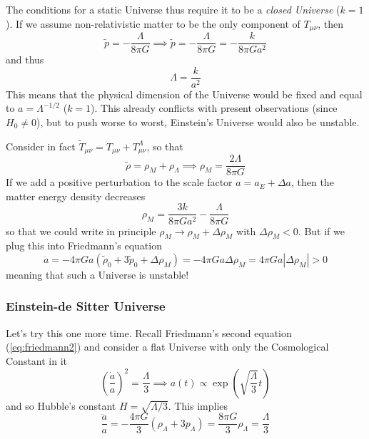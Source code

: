 The conditions for a static Universe thus require it to be a \emph{closed Universe} ($k=1$). If we assume non-relativistic matter to be the only component of $T_{\mu\nu}$, then
\begin{equation}
    \tilde{p} = -\frac{\Lambda}{8\pi G} \implies  \tilde{p} = -\frac{\Lambda}{8\pi G} = -\frac{k}{8\pi G a^{2}}
\end{equation}
and thus
\begin{equation}
    \Lambda = \frac{k}{a^{2}}
\end{equation}
This means that the physical dimension of the Universe would be fixed and equal to $a = \Lambda^{-1/2}$ ($k=1$). This already conflicts with present observations (since $H_{0} \neq 0$), but to push worse to worst, Einstein's Universe would also be unstable.
\par Consider in fact $\tilde{T}_{\mu\nu} = T_{\mu\nu} + T^{\Lambda}_{\mu\nu}$, so that 
\begin{equation}
    \tilde{\rho} = \rho_{M} + \rho_{\Lambda} \implies \rho_{M} = \frac{2\Lambda}{8\pi G}
\end{equation}
If we add a positive perturbation to the scale factor $a = a_{E} + \Delta a$, then the matter energy density decreases
\begin{equation}
    \rho_{M} = \frac{3k}{8\pi G a^{2}} - \frac{\Lambda}{8\pi G}
\end{equation}
so that we could write in principle $\rho_{M} \to \rho_{M} + \Delta\rho_{M}$ with $\Delta\rho_{M} < 0$. But if we plug this into Friedmann's equation
\begin{equation}
    \ddot{a} = -4\pi G a (\tilde{\rho}_{0}+3\tilde{p}_{0} + \Delta\rho_{M}) = - 4\pi G a \Delta\rho_{M} = 4\pi G a |\Delta\rho_{M}| > 0
\end{equation}
meaning that such a Universe is unstable!

\subsubsection{Einstein-de Sitter Universe}

Let's try this one more time. Recall Friedmann's second equation (\ref{eq:friedmann2}) and consider a flat Universe with only the Cosmological Constant in it
\begin{equation}
    \left(\frac{\dot{a}}{a}\right)^{2} = \frac{\Lambda}{3} \implies a(t) \propto \exp\left(\sqrt{\frac{\Lambda}{3}}t\right)
\end{equation}
and so Hubble's constant $H = \sqrt{\Lambda/3}$. This implies 
\begin{equation}
    \frac{\ddot{a}}{a} = -\frac{4\pi G}{3}(\rho_{\Lambda}+3p_{\Lambda}) = \frac{8\pi G}{3}\rho_{\Lambda} = \frac{\Lambda}{3}
\end{equation}


